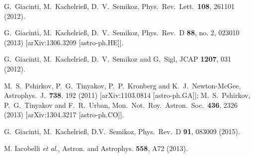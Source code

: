 \documentclass[prd,aps,twocolumn]{revtex4}
\begin{document}
\begin{thebibliography}{99}
  


  G.~Giacinti, M.~Kachelrie{\ss}, D.~V.~Semikoz,
  Phys.\ Rev.\ Lett.\  {\bf 108}, 261101 (2012).

  G.~Giacinti, M.~Kachelrie{\ss}, D.~V.~Semikoz,
  Phys.\ Rev.\ D {\bf 88}, no. 2, 023010 (2013)
  [arXiv:1306.3209 [astro-ph.HE]].


  G.~Giacinti, M.~Kachelrie\ss, D.~V.~Semikoz and G.~Sigl,
  JCAP {\bf 1207}, 031 (2012).

  
  M.~S.~Pshirkov, P.~G.~Tinyakov, P.~P.~Kronberg and K.~J.~Newton-McGee,
  Astrophys.\ J.\  {\bf 738}, 192 (2011)
  [arXiv:1103.0814 [astro-ph.GA]];
M.~S.~Pshirkov, P.~G.~Tinyakov and F.~R.~Urban,
  Mon.\ Not.\ Roy.\ Astron.\ Soc.\  {\bf 436}, 2326 (2013)
  [arXiv:1304.3217 [astro-ph.CO]].

  G.~Giacinti, M.~Kachelrie{\ss}, D.V.~Semikoz,
Phys.\ Rev.\ D {\bf 91}, 083009 (2015).
  
   M. Iacobelli {\it et al.}, 
Astron. and Astrophys. {\bf 558}, A72 (2013).


\end{thebibliography}
\end{document}
